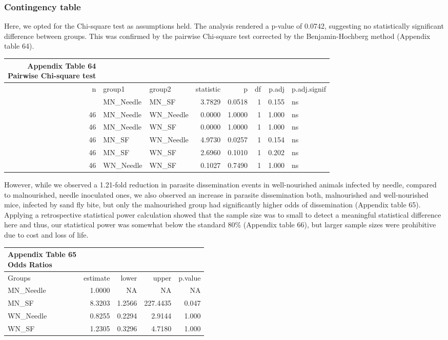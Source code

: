 \documentclass[
  12pt,
  letterpaper,
]{article}
\begin{document}
\subsubsection{Contingency table}\label{contingency-table-1}

Here, we opted for the Chi-square test as assumptions held. The analysis rendered a p-value of 0.0742, suggesting no statistically significant difference between groups. This was confirmed by the pairwise Chi-square test corrected by the Benjamin-Hochberg method (Appendix table 64).

\begin{longtable}{rllrrrrl}
\caption*{
{\large \textbf{Appendix Table 64}} \\ 
{\small \textbf{Pairwise Chi-square test}}
} \\ 
\toprule
n & group1 & group2 & statistic & p & df & p.adj & p.adj.signif \\ 
\midrule\addlinespace[2.5pt]
46 & MN\_Needle & MN\_SF & 3.7829 & 0.0518 & 1 & 0.155 & ns \\ 
46 & MN\_Needle & WN\_Needle & 0.0000 & 1.0000 & 1 & 1.000 & ns \\ 
46 & MN\_Needle & WN\_SF & 0.0000 & 1.0000 & 1 & 1.000 & ns \\ 
46 & MN\_SF & WN\_Needle & 4.9730 & 0.0257 & 1 & 0.154 & ns \\ 
46 & MN\_SF & WN\_SF & 2.6960 & 0.1010 & 1 & 0.202 & ns \\ 
46 & WN\_Needle & WN\_SF & 0.1027 & 0.7490 & 1 & 1.000 & ns \\ 
\bottomrule
\end{longtable}

However, while we observed a 1.21-fold reduction in parasite dissemination events in well-nourished animals infected by needle, compared to malnourished, needle inoculated ones, we also observed an increase in parasite dissemination both, malnourished and well-nourished mice, infected by sand fly bite, but only the malnourished group had significantly higher odds of dissemination (Appendix table 65). Applying a retrospective statistical power calculation showed that the sample size was to small to detect a meaningful statistical difference here and thus, our statistical power was somewhat below the standard 80\% (Appendix table 66), but larger sample sizes were prohibitive due to cost and loss of life.

\begin{longtable}{l|rrrr}
\caption*{
{\large \textbf{Appendix Table 65}} \\ 
{\small \textbf{Odds Ratios}}
} \\ 
\toprule
\multicolumn{1}{l}{Groups} & estimate & lower & upper & p.value \\ 
\midrule\addlinespace[2.5pt]
MN\_Needle & 1.0000 & NA & NA & NA \\ 
MN\_SF & 8.3203 & 1.2566 & 227.4435 & 0.047 \\ 
WN\_Needle & 0.8255 & 0.2294 &   2.9144 & 1.000 \\ 
WN\_SF & 1.2305 & 0.3296 &   4.7180 & 1.000 \\ 
\bottomrule
\end{longtable}
\end{document}
